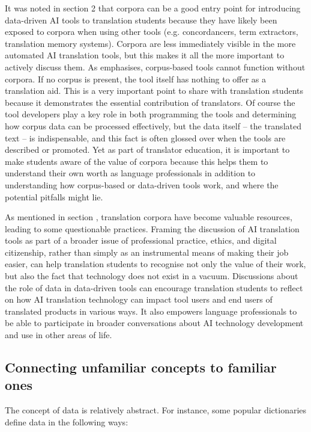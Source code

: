 \documentclass[output=paper]{langscibook}
\begin{document}
It was noted in section 2 that corpora can be a good entry point for introducing data-driven AI tools to translation students because they have likely been exposed to corpora when using other tools (e.g. concordancers, term extractors, translation memory systems). Corpora are less immediately visible in the more automated AI translation tools, but this makes it all the more important to actively discuss them. As \citet{kenny2011} emphasises, corpus-based tools cannot function without corpora. If no corpus is present, the tool itself has nothing to offer as a translation aid. This is a very important point to share with translation students because it demonstrates the essential contribution of translators. Of course the tool developers play a key role in both programming the tools and determining how corpus data can be processed effectively, but the data itself – the translated text – is indispensable, and this fact is often glossed over when the tools are described or promoted. Yet as part of translator education, it is important to make students aware of the value of corpora because this helps them to understand their own worth as language professionals in addition to understanding how corpus-based or data-driven tools work, and where the potential pitfalls might lie.

As mentioned in section , translation corpora have become valuable resources, leading to some questionable practices. Framing the discussion of AI translation tools as part of a broader issue of professional practice, ethics, and digital citizenship, rather than simply as an instrumental means of making their job easier, can help translation students to recognise not only the value of their work, but also the fact that technology does not exist in a vacuum. Discussions about the role of data in data-driven tools can encourage translation students to reflect on how AI translation technology can impact tool users and end users of translated products in various ways. It also empowers language professionals to be able to participate in broader conversations about AI technology development and use in other areas of life.

\subsection{Connecting unfamiliar concepts to familiar ones}\label{sec:4:4.2}
The concept of data is relatively abstract. For instance, some popular dictionaries define data in the following ways:
\end{document}

